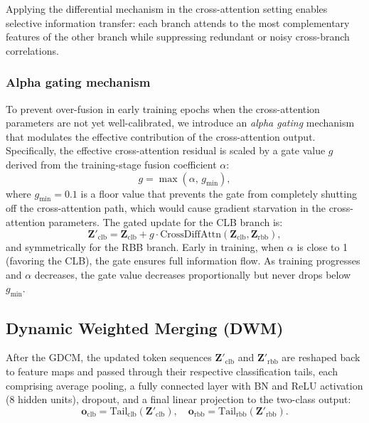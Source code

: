 Applying the differential mechanism in the cross-attention setting enables selective information transfer: each branch attends to the most complementary features of the other branch while suppressing redundant or noisy cross-branch correlations.

\subsubsection{Alpha gating mechanism}

To prevent over-fusion in early training epochs when the cross-attention parameters are not yet well-calibrated, we introduce an \emph{alpha gating} mechanism that modulates the effective contribution of the cross-attention output. Specifically, the effective cross-attention residual is scaled by a gate value $g$ derived from the training-stage fusion coefficient $\alpha$:
\begin{equation}\label{eq:alpha_gate}
    g = \max(\alpha, \, g_{\min}),
\end{equation}
where $g_{\min} = 0.1$ is a floor value that prevents the gate from completely shutting off the cross-attention path, which would cause gradient starvation in the cross-attention parameters. The gated update for the CLB branch is:
\begin{equation}
    \mathbf{Z}'_{\text{clb}} = \mathbf{Z}_{\text{clb}} + g \cdot \text{CrossDiffAttn}(\mathbf{Z}_{\text{clb}}, \mathbf{Z}_{\text{rbb}}),
\end{equation}
and symmetrically for the RBB branch. Early in training, when $\alpha$ is close to 1 (favoring the CLB), the gate ensures full information flow. As training progresses and $\alpha$ decreases, the gate value decreases proportionally but never drops below $g_{\min}$.


\subsection{Dynamic Weighted Merging (DWM)}\label{sec:fusion}

After the GDCM, the updated token sequences $\mathbf{Z}'_{\text{clb}}$ and $\mathbf{Z}'_{\text{rbb}}$ are reshaped back to feature maps and passed through their respective classification tails, each comprising average pooling, a fully connected layer with BN and ReLU activation (8 hidden units), dropout, and a final linear projection to the two-class output:
\begin{equation}
    \mathbf{o}_{\text{clb}} = \text{Tail}_{\text{clb}}(\mathbf{Z}'_{\text{clb}}), \quad
    \mathbf{o}_{\text{rbb}} = \text{Tail}_{\text{rbb}}(\mathbf{Z}'_{\text{rbb}}).
\end{equation}

